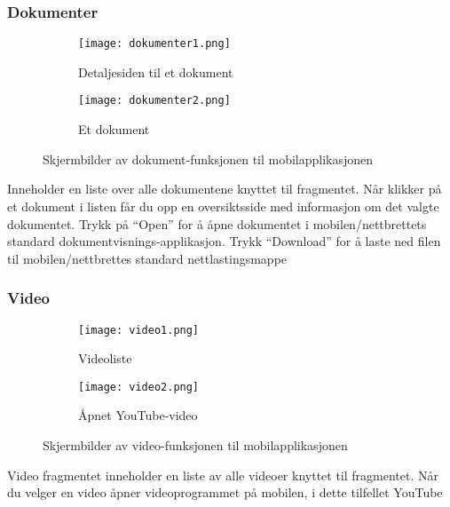\documentclass[../main.tex]{subfiles}
\begin{document}
\subsubsection{Dokumenter}

\begin{figure}[H]
        \centering
        \begin{subfigure}[b]{0.3\textwidth}
                \centering
                \texttt{[image: dokumenter1.png]}
                \caption{Detaljesiden til et dokument}
        \end{subfigure}
        \quad
        \begin{subfigure}[b]{0.3\textwidth}
                \centering
                \texttt{[image: dokumenter2.png]}
                \caption{Et dokument}
        \end{subfigure}
        \caption{Skjermbilder av dokument-funksjonen til mobilapplikasjonen}
\end{figure}

Inneholder en liste over alle dokumentene knyttet til fragmentet. Når klikker på et dokument i listen får du opp en oversiktsside med informasjon om det valgte dokumentet. Trykk på “Open” for å åpne dokumentet i mobilen/nettbrettets standard dokumentvisnings-applikasjon. Trykk “Download” for å laste ned filen til mobilen/nettbrettes standard nettlastingsmappe

\subsubsection{Video}

\begin{figure}[H]
        \centering
        \begin{subfigure}[b]{0.3\textwidth}
                \centering
                \texttt{[image: video1.png]}
                \caption{Videoliste}
        \end{subfigure}
        \quad
        \begin{subfigure}[b]{0.3\textwidth}
                \centering
                \texttt{[image: video2.png]}
                \caption{Åpnet YouTube-video}
        \end{subfigure}
        \caption{Skjermbilder av video-funksjonen til mobilapplikasjonen}
\end{figure}

Video fragmentet inneholder en liste av alle videoer knyttet til fragmentet. Når du velger en video åpner videoprogrammet på mobilen, i dette tilfellet YouTube
\end{document}
